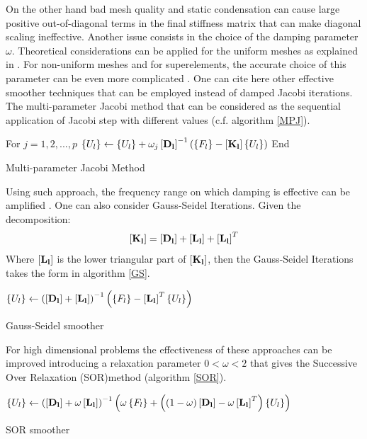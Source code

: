    On the other hand bad mesh quality and static condensation can cause large positive out-of-diagonal terms in the final stiffness matrix that can make diagonal scaling ineffective. Another issue consists in the choice of the damping parameter $\omega$. Theoretical considerations can be applied for the uniform meshes as explained in \cite{saad2003iterative}. For non-uniform meshes and for superelements, the accurate choice of this parameter can be even more complicated \cite{bin2010geometric}.
   One can cite here other effective smoother techniques that can be employed instead of damped Jacobi iterations.
   The  multi-parameter Jacobi method that can be considered as the sequential application of Jacobi step with different values (c.f. algorithm \ref{MPJ}).
     \begin{algorithm}
     For $j=1,2,...,p$\;
    $\left\lbrace{U_{l}}\right \rbrace\gets\left\lbrace{U_{l}}\right \rbrace+\omega_j\left[{\mathbf{D_{l}}}\right]^{-1}\left(\left\lbrace{F_{l}}\right \rbrace-\left[{\mathbf{K_{l}}}\right]\left\lbrace{U_{l}}\right \rbrace\right)$\;
    End\;
    \caption{Multi-parameter Jacobi Method \label{MPJ}}
     \end{algorithm}
  Using such approach, the frequency range on which damping is effective can be amplified \cite{bin2009efficient}.
  One can also consider Gauss-Seidel Iterations. Given the decomposition:
  \begin{equation}
  \left[{\mathbf{K_{l}}}\right]=\left[{\mathbf{D_{l}}}\right]+\left[{\mathbf{L_{l}}}\right]+\left[{\mathbf{L_{l}}}\right]^T
  \end{equation}
  Where $\left[{\mathbf{L_{l}}}\right]$ is the lower triangular part of $\left[{\mathbf{K_{l}}}\right]$, then the Gauss-Seidel Iterations takes the form in algorithm \ref{GS}.
\begin{algorithm} 
       $\left\lbrace{U_{l}}\right \rbrace\gets\left(\left[{\mathbf{D_{l}}}\right]+\left[{\mathbf{L_{l}}}\right]\right)^{-1}\left(\left\lbrace{F_{l}}\right \rbrace-\left[{\mathbf{L_{l}}}\right]^T\left\lbrace{U_{l}}\right \rbrace\right)$\;
       \caption{Gauss-Seidel smoother\label{GS}}
\end{algorithm}
For high dimensional problems the effectiveness of these approaches can be improved introducing a relaxation parameter $0<\omega<2$ that gives the Successive Over Relaxation (SOR)method (algorithm \ref{SOR}).
 \begin{algorithm} 
        $\left\lbrace{U_{l}}\right \rbrace\gets\left(\left[{\mathbf{D_{l}}}\right]+\omega\left[{\mathbf{L_{l}}}\right]\right)^{-1}\left(\omega\left\lbrace{F_{l}}\right \rbrace+\left((1-\omega)\left[{\mathbf{D_{l}}}\right]-\omega\left[{\mathbf{L_{l}}}\right]^T\right)\left\lbrace{U_{l}}\right \rbrace\right)$\;
        \caption{SOR smoother\label{SOR}}
 \end{algorithm}
